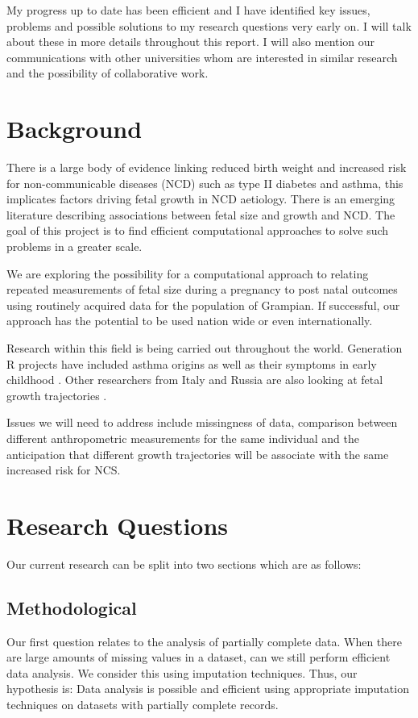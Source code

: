 \documentclass[bsc]{abdnthesis}
\begin{document}
My progress up to date has been efficient and I have identified key issues, problems and possible solutions to my research questions very early on. I will talk about these in more details throughout this report. I will also mention our communications with other universities whom are interested in similar research and the possibility of collaborative work.
\section{Background} %
\label{sec:background}
There is a large body of evidence linking reduced birth weight and increased risk for non-communicable diseases (NCD) such as type II diabetes and asthma\cite{ turner1, turner2, turner3, generation-r1, generation-r2}, this implicates factors driving fetal growth in NCD aetiology. There is an emerging literature describing associations between fetal size and growth and NCD. The goal of this project is to find efficient computational approaches to solve such problems in a greater scale. 

We are exploring the possibility for a computational approach to relating repeated measurements of fetal size during a pregnancy to post natal outcomes using routinely acquired data for the population of Grampian. If successful, our approach has the potential to be used nation wide or even internationally. 

Research within this field is being carried out throughout the world. Generation R projects have included asthma origins \cite{ generation-r1} as well as their symptoms in early childhood \cite{ generation-r2}. Other researchers from Italy and Russia are also looking at fetal growth trajectories \cite{luccia1, luccia2, luccia3, luccia4}. 

Issues we will need to address include missingness of data, comparison between different anthropometric measurements for the same individual and the anticipation that different growth trajectories will be associate with the same increased risk for NCS.  
\section{Research Questions} %
\label{sec:research_questions}
Our current research can be split into two sections which are as follows:
\subsection{Methodological} %
\label{sub:methodological}
Our first question relates to the analysis of partially complete data. When there are large amounts of missing values in a dataset, can we still perform efficient data analysis. We consider this using imputation techniques. Thus, our hypothesis is: Data analysis is possible and efficient using appropriate imputation techniques on datasets with partially complete records.
\end{document}
